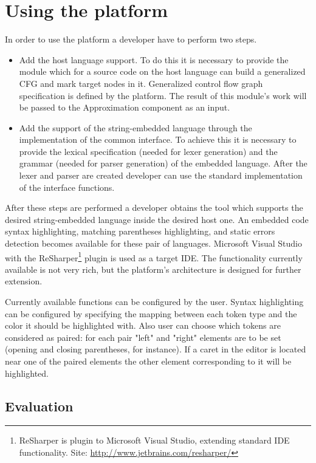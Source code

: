 \section{Using the platform}

In order to use the platform a developer have to perform two steps.
\begin{itemize}
\item Add the host language support. To do this it is necessary to provide the module which for a source code on the host language can build a generalized CFG and mark target nodes in it. Generalized control flow graph specification is defined by the platform. The result of this module's work will be passed to the Approximation component as an input.
\item Add the support of the string-embedded language through the implementation of the common interface. To achieve this it is necessary to provide the lexical specification (needed for lexer generation) and the grammar (needed for parser generation) of the embedded language. After the lexer and parser are created developer can use the standard implementation of the interface functions.
\end{itemize}

After these steps are performed a developer obtains the tool which supports the desired string-embedded language inside the desired host one. An embedded code syntax highlighting, matching parentheses highlighting, and static errors detection becomes available for these pair of languages. Microsoft Visual Studio with the ReSharper\footnote{ReSharper is plugin to Microsoft Visual Studio, extending standard IDE functionality. Site: \url{http://www.jetbrains.com/resharper/}} plugin is used as a target IDE. The functionality currently available is not very rich, but the platform's architecture is designed for further extension.

Currently available functions can be configured by the user. Syntax highlighting can be configured by specifying the mapping between each token type and the color it should be highlighted with. Also user can choose which tokens are considered as paired: for each pair "left" and "right" elements are to be set (opening and closing parentheses, for instance). If a caret in the editor is located near one of the paired elements the other element corresponding to it will be highlighted.

\subsection{Evaluation}

